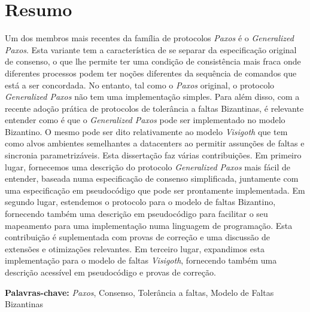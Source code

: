 
\section*{Resumo}


Um dos membros mais recentes da família de protocolos \textit{Paxos} é o \textit{Generalized Paxos}. Esta variante tem a característica de se separar da especificação original de consenso, o que lhe permite ter uma condição de consistência mais fraca onde diferentes processos podem ter noções diferentes da sequência de comandos que está a ser concordada. No entanto, tal como o \textit{Paxos} original, o protocolo \textit{Generalized Paxos} não tem uma implementação simples. Para além disso, com a recente adoção prática de protocolos de tolerância a faltas Bizantinas, é relevante entender como é que o \textit{Generalized Paxos} pode ser implementado no modelo Bizantino. O mesmo pode ser dito relativamente ao modelo \textit{Visigoth} que tem como alvos ambientes semelhantes a datacenters ao permitir assunções de faltas e sincronia parametrizáveis. Esta dissertação faz várias contribuições. Em primeiro lugar, fornecemos uma descrição do protocolo \textit{Generalized Paxos} mais fácil de entender, baseada numa especificação de consenso simplificada, juntamente com uma especificação em pseudocódigo que pode ser prontamente implementada. Em segundo lugar, estendemos o protocolo para o modelo de faltas Bizantino, fornecendo também uma descrição em pseudocódigo para facilitar o seu mapeamento para uma implementação numa linguagem de programação. Esta contribuição é suplementada com provas de correção e uma discussão de extensões e otimizações relevantes. Em terceiro lugar, expandimos esta implementação para o modelo de faltas \textit{Visigoth}, fornecendo também uma descrição acessível em pseudocódigo e provas de correção. 

\vfill

\textbf{\Large Palavras-chave:} \textit{Paxos}, Consenso, Tolerância a faltas, Modelo de Faltas Bizantinas

